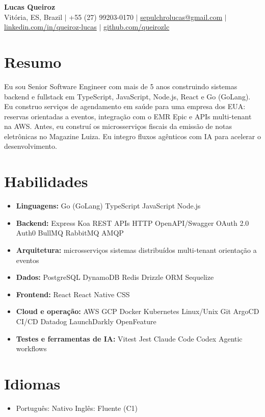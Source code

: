 \documentclass[letterpaper,10pt]{article}
\newcommand{\resumeItem}[1]{\item\small{#1}}
\newcommand{\resumeSubHeadingList}{\begin{itemize}[leftmargin=0.15in, label={}, nosep, beginpenalty=10000]}
\newcommand{\resumeSubHeadingListEnd}{\end{itemize}}
\begin{document}
\begin{center}
  \textbf{\Huge Lucas Queiroz} \\[3pt]
  \small Vit\'oria, ES, Brazil $|$ +55 (27) 99203-0170 $|$ \href{mailto:sepulchrolucas@gmail.com}{sepulchrolucas@gmail.com} $|$
  \href{https://linkedin.com/in/queiroz-lucas}{linkedin.com/in/queiroz-lucas} $|$
  \href{https://github.com/queirozlc}{github.com/queirozlc}
\end{center}
\vspace{2pt}

\section{Resumo}
Eu sou Senior Software Engineer com mais de 5 anos construindo sistemas backend e fullstack em TypeScript, JavaScript, Node.js, React e Go (GoLang). Eu construo servi\c{c}os de agendamento em sa\'ude para uma empresa dos EUA: reservas orientadas a eventos, integra\c{c}\~ao com o EMR Epic e APIs multi-tenant na AWS. Antes, eu constru\'i os microsservi\c{c}os fiscais da emiss\~ao de notas eletr\^onicas no Magazine Luiza. Eu integro fluxos ag\^enticos com IA para acelerar o desenvolvimento.

\section{Habilidades}
\resumeSubHeadingList
\resumeItem{\textbf{Linguagens:} Go (GoLang) \textbar{} TypeScript \textbar{} JavaScript \textbar{} Node.js}
\resumeItem{\textbf{Backend:} Express \textbar{} Koa \textbar{} REST APIs \textbar{} HTTP \textbar{} OpenAPI/Swagger \textbar{} OAuth 2.0 \textbar{} Auth0 \textbar{} BullMQ \textbar{} RabbitMQ \textbar{} AMQP}
\resumeItem{\textbf{Arquitetura:} microsservi\c{c}os \textbar{} sistemas distribu\'idos \textbar{} multi-tenant \textbar{} orienta\c{c}\~ao a eventos}
\resumeItem{\textbf{Dados:} PostgreSQL \textbar{} DynamoDB \textbar{} Redis \textbar{} Drizzle ORM \textbar{} Sequelize}
\resumeItem{\textbf{Frontend:} React \textbar{} React Native \textbar{} CSS}
\resumeItem{\textbf{Cloud e opera\c{c}\~ao:} AWS \textbar{} GCP \textbar{} Docker \textbar{} Kubernetes \textbar{} Linux/Unix \textbar{} Git \textbar{} ArgoCD \textbar{} CI/CD \textbar{} Datadog \textbar{} LaunchDarkly \textbar{} OpenFeature}
\resumeItem{\textbf{Testes e ferramentas de IA:} Vitest \textbar{} Jest \textbar{} Claude Code \textbar{} Codex \textbar{} Agentic workflows}\resumeSubHeadingListEnd

\section{Idiomas}
\resumeSubHeadingList
\resumeItem{Portugu\^es: Nativo \textbar{} Ingl\^es: Fluente (C1)}
\resumeSubHeadingListEnd
\end{document}
